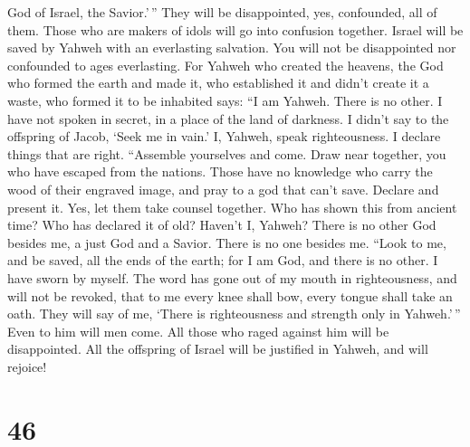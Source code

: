 God of Israel, the Savior.'\,''  They will be
disappointed, yes, confounded, all of them. Those who are makers of
idols will go into confusion together.  Israel will be
saved by Yahweh with an everlasting salvation. You will not be
disappointed nor confounded to ages everlasting.  For
Yahweh who created the heavens, the God who formed the earth and made
it, who established it and didn't create it a waste, who formed it to be
inhabited says: ``I am Yahweh. There is no other.  I have
not spoken in secret, in a place of the land of darkness. I didn't say
to the offspring of Jacob, `Seek me in vain.' I, Yahweh, speak
righteousness. I declare things that are right. 
``Assemble yourselves and come. Draw near together, you who have escaped
from the nations. Those have no knowledge who carry the wood of their
engraved image, and pray to a god that can't save. 
Declare and present it. Yes, let them take counsel together. Who has
shown this from ancient time? Who has declared it of old? Haven't I,
Yahweh? There is no other God besides me, a just God and a Savior. There
is no one besides me.  ``Look to me, and be saved, all
the ends of the earth; for I am God, and there is no other.
 I have sworn by myself. The word has gone out of my
mouth in righteousness, and will not be revoked, that to me every knee
shall bow, every tongue shall take an oath.  They will
say of me, `There is righteousness and strength only in Yahweh.'\,''
Even to him will men come. All those who raged against him will be
disappointed.  All the offspring of Israel will be
justified in Yahweh, and will rejoice!

\hypertarget{section-45}{%
\section{46}\label{section-45}}

